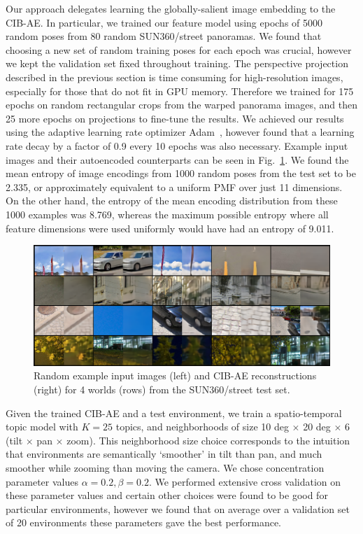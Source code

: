 Our approach delegates learning the globally-salient image embedding to the CIB-AE. In particular, we trained our feature model using epochs of 5000 random poses from 80 random SUN360/street panoramas. We found that choosing a new set of random training poses for each epoch was crucial, however we kept the validation set fixed throughout training. The perspective projection described in the previous section is time consuming for high-resolution images, especially for those that do not fit in GPU memory. Therefore we trained for 175 epochs on random rectangular crops from the warped panorama images, and then 25 more epochs on projections to fine-tune the results. We achieved our results using the adaptive learning rate optimizer Adam~\citep{KingmaAdam}, however found that a learning rate decay by a factor of 0.9 every 10 epochs was also necessary. Example input images and their autoencoded counterparts can be seen in Fig.~\ref{fig:cibae_encodings}. We found the mean entropy of image encodings from 1000 random poses from the test set to be 2.335, or approximately equivalent to a uniform PMF over just 11 dimensions. On the other hand, the entropy of the mean encoding distribution from these 1000 examples was 8.769, whereas the maximum possible entropy where all feature dimensions were used uniformly would have had an entropy of 9.011.

\begin{figure}
    \centering
    \includegraphics[width=\textwidth]{figures/ptz/mc3ae_encodings}
    \caption{Random example input images (left) and CIB-AE reconstructions (right) for 4 worlds (rows) from the SUN360/street test set.}
    \label{fig:cibae_encodings}
\end{figure}

Given the trained CIB-AE and a test environment, we train a spatio-temporal topic model with $K = 25$ topics, and neighborhoods of size 10 deg $\times$ 20 deg $\times$ 6 (tilt $\times$ pan $\times$ zoom). This neighborhood size choice corresponds to the intuition that environments are semantically `smoother' in tilt than pan, and much smoother while zooming than moving the camera. We chose concentration parameter values $\alpha = 0.2, \beta = 0.2$. We performed extensive cross validation on these parameter values and certain other choices were found to be good for particular environments, however we found that on average over a validation set of 20 environments these parameters gave the best performance.

